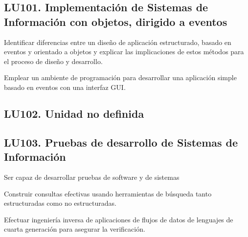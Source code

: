 \subsection{LU101. Implementación de Sistemas de Información con objetos, dirigido a eventos}\label{sec:LU101}
\begin{LearningUnit}
\begin{LUGoal}
\item Identificar diferencias entre un diseño de aplicación estructurado, basado en eventos y orientado a objetos y explicar las implicaciones de estos métodos para el proceso de diseño y desarrollo.
\end{LUGoal}

\begin{LUObjective}
\item Emplear un ambiente de programación para desarrollar una aplicación simple basado en eventos con una interfaz GUI.
\end{LUObjective}
\end{LearningUnit}

\subsection{LU102. Unidad no definida}\label{sec:LU102}
\subsection{LU103. Pruebas de desarrollo de Sistemas de Información}\label{sec:LU103}
\begin{LearningUnit}
\begin{LUGoal}
\item Ser capaz de desarrollar pruebas de software y de sistemas
\end{LUGoal}

\begin{LUObjective}
\item Construir consultas efectivas usando herramientas de búsqueda tanto estructuradas como no estructuradas.
\item Efectuar ingeniería inversa de aplicaciones de flujos de datos de lenguajes de cuarta generación para asegurar la verificación.
\end{LUObjective}
\end{LearningUnit}

